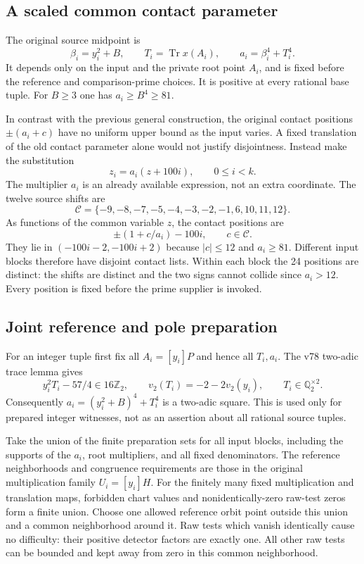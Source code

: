 \documentclass[11pt]{article}
\begin{document}
\subsection{A scaled common contact parameter}

The original source midpoint is
\[
 \beta_i=y_i^2+B,\qquad T_i=\operatorname{Tr}x(A_i),\qquad
                     a_i=\beta_i^4+T_i^4.
\]
It depends only on the input and the private root point $A_i$,
and is fixed before the reference and comparison-prime choices.
It is positive at every rational base tuple.  For $B\ge3$ one
has $a_i\ge B^4\ge81$.

In contrast with the previous general construction, the original
contact positions $\pm(a_i+c)$ have no uniform upper bound as
the input varies.  A fixed translation of the old contact parameter
alone would not justify disjointness.  Instead make the substitution
\begin{equation}\label{eq:abc-common-contact}
                         z_i=a_i(z+100i),
                           \qquad 0\le i<k.
\end{equation}
The multiplier $a_i$ is an already available expression, not an
extra coordinate.  The twelve source shifts are
\[
              \mathcal C=\{-9,-8,-7,-5,-4,-3,-2,-1,6,10,11,12\}.
\]
As functions of the common variable $z$, the contact positions are
\[
                       \pm(1+c/a_i)-100i,
                                  \qquad c\in\mathcal C.
\]
They lie in $(-100i-2,-100i+2)$ because $|c|\le12$ and
$a_i\ge81$.  Different input blocks therefore have disjoint
contact lists.  Within each block the 24 positions are distinct:
the shifts are distinct and the two signs cannot collide since
$a_i>12$.  Every position is fixed before the prime supplier is
invoked.

\subsection{Joint reference and pole preparation}

For an integer tuple first fix all $A_i=[y_i]P$ and hence all
$T_i,a_i$.  The v78 two-adic trace lemma gives
\[
 y_i^2T_i-57/4\in16\mathbb Z_2,\qquad
 v_2(T_i)=-2-2v_2(y_i),\qquad T_i\in\mathbb Q_2^{\times2}.
\]
Consequently $a_i=(y_i^2+B)^4+T_i^4$ is a two-adic square.
This is used only for prepared integer witnesses, not as an
assertion about all rational source tuples.

Take the union of the finite preparation sets for all input blocks,
including the supports of the $a_i$, root multipliers, and all
fixed denominators.  The reference neighborhoods and congruence
requirements are those in the original multiplication family
$U_i=[y_i]H$.  For the finitely many fixed multiplication and
translation maps, forbidden chart values and nonidentically-zero
raw-test zeros form a finite union.  Choose one allowed reference
orbit point outside this union and a common neighborhood around
it.  Raw tests which vanish identically cause no difficulty: their
positive detector factors are exactly one.  All other raw tests
can be bounded and kept away from zero in this common neighborhood.
\end{document}
